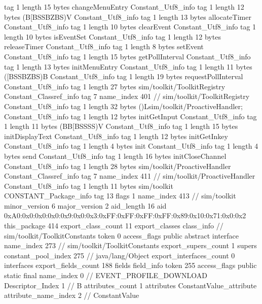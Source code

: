 {{{			tag	1
			length	15
			bytes	changeMenuEntry
		}
		Constant_Utf8_info {
			tag	1
			length	12
			bytes	(B[BSSBZBS)V
		}
		Constant_Utf8_info {
			tag	1
			length	13
			bytes	allocateTimer
		}
		Constant_Utf8_info {
			tag	1
			length	10
			bytes	clearEvent
		}
		Constant_Utf8_info {
			tag	1
			length	10
			bytes	isEventSet
		}
		Constant_Utf8_info {
			tag	1
			length	12
			bytes	releaseTimer
		}
		Constant_Utf8_info {
			tag	1
			length	8
			bytes	setEvent
		}
		Constant_Utf8_info {
			tag	1
			length	15
			bytes	getPollInterval
		}
		Constant_Utf8_info {
			tag	1
			length	13
			bytes	initMenuEntry
		}
		Constant_Utf8_info {
			tag	1
			length	11
			bytes	([BSSBZBS)B
		}
		Constant_Utf8_info {
			tag	1
			length	19
			bytes	requestPollInterval
		}
		Constant_Utf8_info {
			tag	1
			length	27
			bytes	sim/toolkit/ToolkitRegistry
		}
		Constant_Classref_info {
			tag	7
			name_index	401		// sim/toolkit/ToolkitRegistry
		}
		Constant_Utf8_info {
			tag	1
			length	32
			bytes	()Lsim/toolkit/ProactiveHandler;
		}
		Constant_Utf8_info {
			tag	1
			length	12
			bytes	initGetInput
		}
		Constant_Utf8_info {
			tag	1
			length	11
			bytes	(BB[BSSSS)V
		}
		Constant_Utf8_info {
			tag	1
			length	15
			bytes	initDisplayText
		}
		Constant_Utf8_info {
			tag	1
			length	12
			bytes	initGetInkey
		}
		Constant_Utf8_info {
			tag	1
			length	4
			bytes	init
		}
		Constant_Utf8_info {
			tag	1
			length	4
			bytes	send
		}
		Constant_Utf8_info {
			tag	1
			length	16
			bytes	initCloseChannel
		}
		Constant_Utf8_info {
			tag	1
			length	28
			bytes	sim/toolkit/ProactiveHandler
		}
		Constant_Classref_info {
			tag	7
			name_index	411		// sim/toolkit/ProactiveHandler
		}
		Constant_Utf8_info {
			tag	1
			length	11
			bytes	sim/toolkit
		}
		CONSTANT_Package_info {
			tag	13
			flags	1
			name_index	413		// sim/toolkit
			minor_version	6
			major_version	2
			aid_length	16
			aid	0xA0:0x0:0x0:0x0:0x9:0x0:0x3:0xFF:0xFF:0xFF:0xFF:0x89:0x10:0x71:0x0:0x2
		}
	}
	this_package	414
	export_class_count	11
	export_classes {
		class_info {		// sim/toolkit/ToolkitConstants
			token	0
			access_flags	public abstract interface
			name_index	273		// sim/toolkit/ToolkitConstants
			export_supers_count	1
			supers {
				constant_pool_index	275		// java/lang/Object
			}
			export_interfaces_count	0
			interfaces {
			}
			export_fields_count	188
			fields {
			field_info {
				token	255
				access_flags	public static final
				name_index	0		// EVENT_PROFILE_DOWNLOAD
				Descriptor_Index	1		// B
				attributes_count	1
				attributes {
				ConstantValue_attribute {
					attribute_name_index	2		// ConstantValue
}}}}}}}
